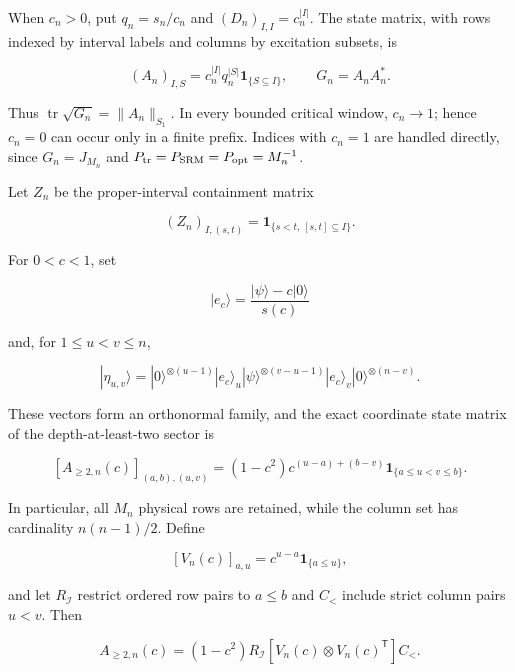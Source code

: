 When \(c_n>0\), put \(q_n=s_n/c_n\) and
\((D_n)_{I,I}=c_n^{|I|}\).  The state matrix, with rows indexed by interval
labels and columns by excitation subsets, is

\begin{equation}\label{eq:supp-state-matrix}
 (A_n)_{I,S}=c_n^{|I|}q_n^{|S|}\mathbf1_{\{S\subseteq I\}},
 \qquad G_n=A_nA_n^*.
\end{equation}

Thus \(\operatorname{tr}\sqrt{G_n}=\|A_n\|_{S_1}\).  In every bounded
critical window, \(c_n\to1\); hence \(c_n=0\) can occur only in a finite
prefix.  Indices with \(c_n=1\) are handled directly, since
\(G_n=J_{M_n}\) and
\(P_{\rm tr}=P_{\rm SRM}=P_{\rm opt}=M_n^{-1}\).

\begin{proposition}
\label{prop:supp-hull-compression}
Let \(Z_n\) be the proper-interval containment matrix

\begin{equation}\label{eq:supp-zeta}
 (Z_n)_{I,(s,t)}=\mathbf1_{\{s<t,\,[s,t]\subseteq I\}}.
\end{equation}

For \(0<c<1\), set

\[
 |e_c\rangle=\frac{|\psi\rangle-c|0\rangle}{s(c)}
\]

and, for \(1\le u<v\le n\),

\[
 |\eta_{u,v}\rangle
 =|0\rangle^{\otimes(u-1)}|e_c\rangle_u
  |\psi\rangle^{\otimes(v-u-1)}|e_c\rangle_v
  |0\rangle^{\otimes(n-v)}.
\]

These vectors form an orthonormal family, and the exact coordinate state
matrix of the depth-at-least-two sector is

\begin{equation}\label{eq:supp-weighted-hull-identity}
 [A_{\ge2,n}(c)]_{(a,b),(u,v)}
 =(1-c^2)c^{(u-a)+(b-v)}
 \mathbf1_{\{a\le u<v\le b\}}.
\end{equation}

In particular, all \(M_n\) physical rows are retained, while the column set
has cardinality \(n(n-1)/2\). Define

\[
 [V_n(c)]_{a,u}=c^{u-a}\mathbf1_{\{a\le u\}},
\]

and let \(R_{\mathcal I}\) restrict ordered row pairs to \(a\le b\) and
\(C_{<}\) include strict column pairs \(u<v\). Then

\[
 A_{\ge2,n}(c)
 =(1-c^2)R_{\mathcal I}
 [V_n(c)\otimes V_n(c)^{\mathsf T}]C_{<}.
\]


\end{proposition}
